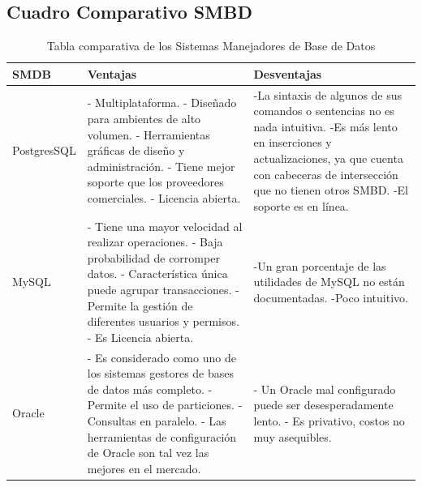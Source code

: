 \newpage
\subsection{Cuadro Comparativo SMBD}
\begin{table}[H]	
\begin{center}
\begin{tabular}{ | m{3cm} | m{4.5cm}| m{4.5cm}| } 
 \hline
 SMDB & Ventajas & Desventajas \\
 \hline
 PostgresSQL 
 &
 - Multiplataforma.
 \newline
 - Diseñado para ambientes de alto volumen.
 \newline
 - Herramientas gráficas de diseño y administración.
 \newline
 - Tiene mejor soporte que los proveedores comerciales.
 \newline
 - Licencia abierta.
 &
-La sintaxis de algunos de sus comandos o sentencias no es nada intuitiva.
\newline
-Es más lento en inserciones y actualizaciones, ya que cuenta con cabeceras de intersección que no tienen otros SMBD.
\newline
-El soporte es en línea.
\\
  \hline
 MySQL
 &
 - Tiene una mayor velocidad al realizar operaciones.
  \newline
 - Baja probabilidad de corromper datos.
  \newline
 - Característica única puede agrupar transacciones.
  \newline
 - Permite la gestión de diferentes usuarios y permisos.
  \newline
 - Es Licencia abierta.
 &
 -Un gran porcentaje de las utilidades de MySQL no están documentadas.
 \newline
 -Poco intuitivo.
 \\
 \hline
 Oracle
 &
 - Es considerado como uno de los sistemas gestores de bases de datos más completo.
  \newline
 - Permite el uso de particiones.
  \newline
 - Consultas en paralelo.
  \newline
 - Las herramientas de configuración de Oracle son tal vez las mejores en el mercado.
 &
 
 - Un Oracle mal configurado puede ser desesperadamente lento.
  \newline
  - Es privativo, costos no muy asequibles.
 \\
 \hline
 \end{tabular}
\caption{Tabla comparativa de los Sistemas Manejadores de Base de Datos}
\label{Tabla:3}
\end{center}
\end{table}	

